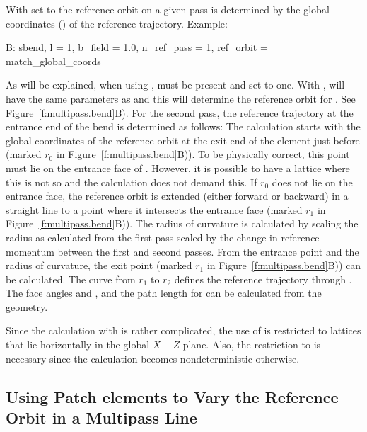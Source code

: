With  set to  the reference
orbit on a given pass is determined by the global coordinates
() of the reference trajectory. Example:
\begin{example} 
  B: sbend, l = 1, b_field = 1.0, n_ref_pass = 1, ref_orbit = match_global_coords
\end{example}
As will be explained, when using ,
 must be present and set to one. With
,  will have the same parameters as
 and this will determine the reference orbit for . See
Figure~\ref{f:multipass.bend}B). For the second pass, the reference
trajectory at the entrance end of the bend is determined as follows:
The calculation starts with the global coordinates of the reference
orbit at the exit end of the element just before  (marked
$r_0$ in Figure~\ref{f:multipass.bend}B)). To be physically correct,
this point must lie on the entrance face of . However, it is
possible to have a lattice where this is not so and the calculation
does not demand this. If $r_0$ does not lie on the entrance face, the
reference orbit is extended (either forward or backward) in a straight
line to a point where it intersects the entrance face (marked $r_1$ in
Figure~\ref{f:multipass.bend}B)). The radius of curvature is
calculated by scaling the radius as calculated from the first pass
scaled by the change in reference momentum between the first and
second passes. From the entrance point and the radius of curvature,
the exit point (marked $r_1$ in Figure~\ref{f:multipass.bend}B)) can
be calculated. The curve from $r_1$ to $r_2$ defines the reference
trajectory through . The face angles  and , and
the path length  for  can be calculated from the
geometry.

Since the calculation with  is rather
complicated, the use of  is restricted to
lattices that lie horizontally in the global $X-Z$ plane. Also, the
restriction to  is necessary since the calculation
becomes nondeterministic otherwise. 

\subsection{Using Patch elements to Vary the Reference Orbit in a Multipass Line}


